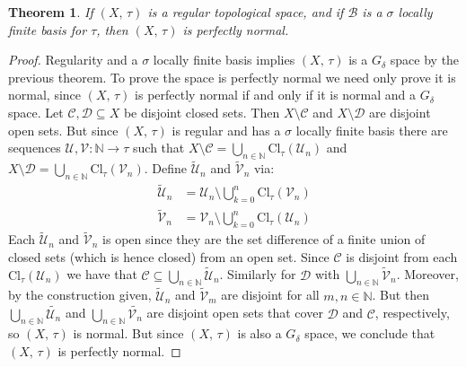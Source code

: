 \documentclass{article}
\theoremstyle{plain}
\newtheorem{theorem}{Theorem}[section]
\theoremstyle{normal}
\begin{document}
        \begin{theorem}
            If $(X,\,\tau)$ is a regular topological space, and if
            $\mathcal{B}$ is a $\sigma$ locally finite basis for $\tau$,
            then $(X,\,\tau)$ is perfectly normal.
        \end{theorem}
        \begin{proof}
            Regularity and a $\sigma$ locally finite basis implies $(X,\,\tau)$
            is a $G_{\delta}$ space by the previous theorem. To prove the space
            is perfectly normal we need only prove it is normal, since
            $(X,\,\tau)$ is perfectly normal if and only if it is normal and a
            $G_{\delta}$ space. Let $\mathcal{C},\mathcal{D}\subseteq{X}$ be
            disjoint closed sets. Then $X\setminus\mathcal{C}$ and
            $X\setminus\mathcal{D}$ are disjoint open sets. But since
            $(X,\,\tau)$ is regular and has a $\sigma$ locally finite basis
            there are sequences
            $\mathcal{U},\mathcal{V}:\mathbb{N}\rightarrow\tau$ such that
            $X\setminus\mathcal{C}=\bigcup_{n\in\mathbb{N}}\textrm{Cl}_{\tau}(\mathcal{U}_{n})$
            and
            $X\setminus\mathcal{D}=\bigcup_{n\in\mathbb{N}}\textrm{Cl}_{\tau}(\mathcal{V}_{n})$.
            Define $\tilde{\mathcal{U}}_{n}$ and
            $\tilde{\mathcal{V}}_{n}$ via:
            \begin{align}
                \tilde{\mathcal{U}}_{n}
                &=\mathcal{U}_{n}\setminus\bigcup_{k=0}^{n}
                    \textrm{Cl}_{\tau}(\mathcal{V}_{n})\\
                \tilde{\mathcal{V}}_{n}
                &=\mathcal{V}_{n}\setminus\bigcup_{k=0}^{n}
                    \textrm{Cl}_{\tau}(\mathcal{U}_{n})
            \end{align}
            Each $\tilde{\mathcal{U}}_{n}$ and $\tilde{\mathcal{V}}_{n}$ is
            open since they are the set difference of a finite union of closed
            sets (which is hence closed) from an open set. Since
            $\mathcal{C}$ is disjoint from each
            $\textrm{Cl}_{\tau}(\mathcal{U}_{n})$ we have that
            $\mathcal{C}\subseteq\bigcup_{n\in\mathbb{N}}\tilde{\mathcal{U}}_{n}$.
            Similarly for $\mathcal{D}$ with
            $\bigcup_{n\in\mathbb{N}}\tilde{\mathcal{V}}_{n}$. Moreover, by the
            construction given, $\tilde{\mathcal{U}}_{n}$ and
            $\tilde{\mathcal{V}}_{m}$ are disjoint for all
            $m,n\in\mathbb{N}$. But then
            $\bigcup_{n\in\mathbb{N}}\tilde{\mathcal{U}_{n}}$ and
            $\bigcup_{n\in\mathbb{N}}\tilde{\mathcal{V}_{n}}$ are disjoint
            open sets that cover $\mathcal{D}$ and $\mathcal{C}$, respectively,
            so $(X,\,\tau)$ is normal. But since $(X,\,\tau)$ is also a
            $G_{\delta}$ space, we conclude that $(X,\,\tau)$ is perfectly
            normal.
        \end{proof}
\end{document}
